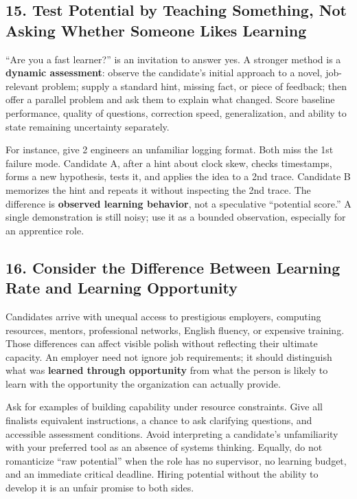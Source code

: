 \subsection*{15. Test Potential by Teaching Something, Not Asking Whether Someone Likes Learning}

``Are you a fast learner?'' is an invitation to answer yes. A stronger method is a \textbf{dynamic assessment}: observe the candidate's initial approach to a novel, job-relevant problem; supply a standard hint, missing fact, or piece of feedback; then offer a parallel problem and ask them to explain what changed. Score baseline performance, quality of questions, correction speed, generalization, and ability to state remaining uncertainty separately.

For instance, give 2 engineers an unfamiliar logging format. Both miss the 1st failure mode. Candidate A, after a hint about clock skew, checks timestamps, forms a new hypothesis, tests it, and applies the idea to a 2nd trace. Candidate B memorizes the hint and repeats it without inspecting the 2nd trace. The difference is \textbf{observed learning behavior}, not a speculative ``potential score.'' A single demonstration is still noisy; use it as a bounded observation, especially for an apprentice role.

\subsection*{16. Consider the Difference Between Learning Rate and Learning Opportunity}

Candidates arrive with unequal access to prestigious employers, computing resources, mentors, professional networks, English fluency, or expensive training. Those differences can affect visible polish without reflecting their ultimate capacity. An employer need not ignore job requirements; it should distinguish what was \textbf{learned through opportunity} from what the person is likely to learn with the opportunity the organization can actually provide.

Ask for examples of building capability under resource constraints. Give all finalists equivalent instructions, a chance to ask clarifying questions, and accessible assessment conditions. Avoid interpreting a candidate's unfamiliarity with your preferred tool as an absence of systems thinking. Equally, do not romanticize ``raw potential'' when the role has no supervisor, no learning budget, and an immediate critical deadline. Hiring potential without the ability to develop it is an unfair promise to both sides.

